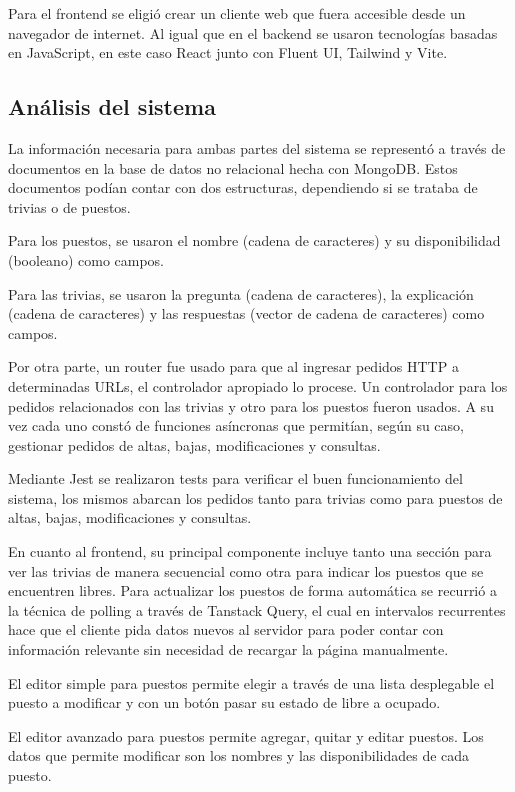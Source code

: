 \documentclass{article}
\begin{document}
Para el frontend se eligió crear un cliente web que fuera accesible desde un navegador de internet. Al igual que en el backend se usaron tecnologías basadas en JavaScript, en este caso React junto con Fluent UI, Tailwind y Vite.
\newpage
\subsection{Análisis del sistema}
La información necesaria para ambas partes del sistema se representó a través de documentos en la base de datos no relacional hecha con MongoDB. Estos documentos podían contar con dos estructuras, dependiendo si se trataba de trivias o de puestos.

Para los puestos, se usaron el nombre (cadena de caracteres) y su disponibilidad (booleano) como campos.

Para las trivias, se usaron la pregunta (cadena de caracteres), la explicación (cadena de caracteres) y las respuestas (vector de cadena de caracteres) como campos.

Por otra parte, un router fue usado para que al ingresar pedidos HTTP a determinadas URLs, el controlador apropiado lo procese. Un controlador para los pedidos relacionados con las trivias y otro para los puestos fueron usados. A su vez cada uno constó de funciones asíncronas que permitían, según su caso, gestionar pedidos de altas, bajas, modificaciones y consultas.

Mediante Jest se realizaron tests para verificar el buen funcionamiento del sistema, los mismos abarcan los pedidos tanto para trivias como para puestos de altas, bajas, modificaciones y consultas.

En cuanto al frontend, su principal componente incluye tanto una sección para ver las trivias de manera secuencial como otra para indicar los puestos que se encuentren libres. Para actualizar los puestos de forma automática se recurrió a la técnica de polling a través de Tanstack Query, el cual en intervalos recurrentes hace que el cliente pida datos nuevos al servidor para poder contar con información relevante sin necesidad de recargar la página manualmente.

El editor simple para puestos permite elegir a través de una lista desplegable el puesto a modificar y con un botón pasar su estado de libre a ocupado.

El editor avanzado para puestos permite agregar, quitar y editar puestos. Los datos que permite modificar son los nombres y las disponibilidades de cada puesto.
\end{document}
